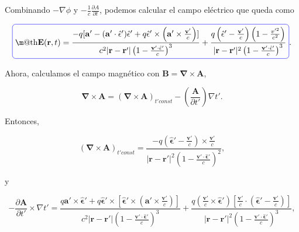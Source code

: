 \documentclass[a4paper,11pt]{article}
\makeatletter
\numberwithin{equation}{section}
\newcommand*{\boxcolor}{blue}
\renewcommand{\boxed}[1]{\textcolor{\boxcolor}{%
\tikz[baseline={([yshift=-1ex]current bounding box.center)}] \node [rectangle, minimum width=1ex,rounded corners,draw] {\normalcolor\m@th$\displaystyle#1$};}}
\makeatother
\begin{document}
Combinando $- \nabla \phi$ y $- \frac{1}{c}\frac{\partial A}{\partial t}$, podemos 
calcular el campo eléctrico que queda como 

\begin{equation}
 \boxed{\mathbf{E}(\mathbf{r},t) = \frac{-q[\mathbf{a}' - (\mathbf{a}' \cdot 
 \hat{\mathbf{\epsilon}}')\hat{\mathbf{\epsilon}}' + q\hat{\mathbf{\epsilon}}' 
 \times \left(\mathbf{a}' \times \frac{\mathbf{v}'}{c} \right)]}{c^2 
 |\mathbf{r} - \mathbf{r}'|\left(1 - \frac{\mathbf{v}'\cdot 
 \hat{\mathbf{\epsilon}}'}{c} \right)^3} + 
 \frac{q \left(\hat{\mathbf{\epsilon}}' - \frac{\mathbf{v}'}{c} \right)\left( 
 1 - \frac{v'^2}{c^2}\right)}{|\mathbf{r} - \mathbf{r}'|^2 
  \left(1 - \frac{\mathbf{v}'\cdot \hat{\mathbf{\epsilon}}'}{c} \right)^3}}.
\end{equation}

Ahora, calculamos el campo magnético con $\mathbf{B} = \pmb{\nabla} \times \mathbf{A}$, 

\begin{equation}
 \pmb{\nabla} \times \mathbf{A} = ( \pmb{\nabla} \times \mathbf{A})_{t'const} - 
 \left(\frac{\mathbf{A}}{\partial t'} \right) \nabla t'.
\end{equation}

Entonces, 

\begin{equation}
  ( \pmb{\nabla} \times \mathbf{A})_{t'const} = \frac{-q\left(\hat{\mathbf{\epsilon}}' 
  - \frac{\mathbf{v}'}{c}\right) \times \frac{\mathbf{v}'}{c}}{|\mathbf{r} - \mathbf{r}'|^2 
  \left(1 - \frac{\mathbf{v}'\cdot \hat{\mathbf{\epsilon}}'}{c} \right)^2},
\end{equation}

y 

\begin{equation}
 - \frac{\partial \mathbf{A}}{\partial t'} \times \nabla t' = 
 \frac{q\mathbf{a}' \times  \hat{\mathbf{\epsilon}}' + 
 q \hat{\mathbf{\epsilon}}' \times \left[ \hat{\mathbf{\epsilon}}' \times 
 \left(\mathbf{a}' \times \frac{\mathbf{v}'}{c} \right)\right]}{c^2 
 |\mathbf{r} - \mathbf{r}'|\left(1 - \frac{\mathbf{v}'\cdot 
 \hat{\mathbf{\epsilon}}'}{c} \right)^3} + 
 \frac{q\left(\frac{\mathbf{v}'}{c} \times \hat{\mathbf{\epsilon}}' \right)
 \left[\frac{\mathbf{v}'}{c} \cdot \left(\hat{\mathbf{\epsilon}}' - 
 \frac{\mathbf{v}'}{c}\right) \right]}{|\mathbf{r} - \mathbf{r}'|^2\left(1 - \frac{\mathbf{v}'\cdot 
 \hat{\mathbf{\epsilon}}'}{c} \right)^3},
\end{equation}
\end{document}
